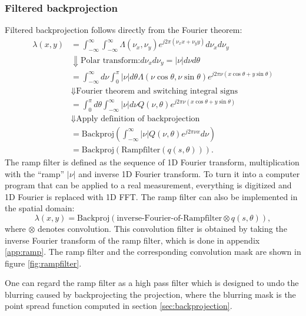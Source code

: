 \documentclass[11pt,oneside]{book}
\begin{document}
\subsubsection{Filtered backprojection}
Filtered backprojection follows directly from the Fourier theorem:
\begin{align}
  \lambda(x,y) &= \int_{-\infty}^{\infty} \int_{-\infty}^{\infty}
         \Lambda(\nu_x, \nu_y) e^{j2\pi (\nu_x x + \nu_y y)} d \nu_x d \nu_y\\
      &\Downarrow \mbox{Polar transform:} d \nu_x d \nu_y = |\nu|
         d\nu d\theta \nonumber\\
      &= \int_{-\infty}^{\infty} d\nu \int_0^\pi |\nu| d\theta
            \Lambda(\nu \cos \theta, \nu \sin \theta)
            e^{j2\pi \nu (x \cos \theta + y \sin \theta)}\\
      &\Downarrow \mbox{Fourier theorem and switching integral signs}
               \nonumber\\
      &= \int_0^\pi d\theta \int_{-\infty}^{\infty} |\nu| d\nu
            Q(\nu, \theta) e^{j2\pi \nu (x \cos \theta + y \sin \theta)}\\
      &\Downarrow \mbox{Apply definition of backprojection} \nonumber\\
      &= \mbox{Backproj} \left( \int_{-\infty}^{\infty}
            |\nu| Q(\nu, \theta) e^{j2\pi \nu x} d\nu \right)\\
      &= \mbox{Backproj}\left( \mbox{Rampfilter} \left( q(s,\theta) \right)
            \right).
\end{align}
The ramp filter is defined as the sequence of 1D Fourier transform,
multiplication with the ``ramp'' $| \nu |$ and inverse 1D Fourier
transform.  To turn it into a computer program that can be applied to
a real measurement, everything is digitized and 1D Fourier is replaced
with 1D FFT. The ramp filter can also be implemented in the spatial
domain:
\begin{equation}
  \lambda(x,y) = \mbox{Backproj}\left( \mbox{inverse-Fourier-of-Rampfilter} 
                  \otimes q(s, \theta) \right),
\end{equation}
where $\otimes$ denotes convolution. This convolution filter is
obtained by taking the inverse Fourier transform of the ramp filter,
which is done in appendix \ref{app:ramp}. The ramp filter and the
corresponding convolution mask are shown in figure
\ref{fig:rampfilter}.

One can regard the ramp filter as a high pass filter which is designed to undo
the blurring caused by backprojecting the projection, where the blurring mask
is the point spread function computed in section \ref{sec:backprojection}.
\end{document}
